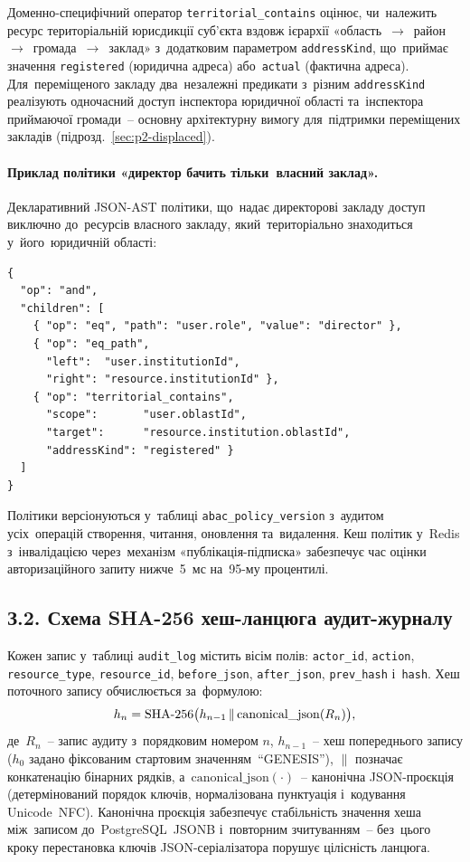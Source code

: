 Доменно-специфічний оператор \texttt{territorial\_contains} оцінює, чи~належить ресурс територіальній юрисдикції суб'єкта вздовж ієрархії «область~$\to$~район~$\to$~громада~$\to$~заклад» з~додатковим параметром \texttt{addressKind}, що~приймає значення \texttt{registered} (юридична адреса) або~\texttt{actual} (фактична адреса). Для~переміщеного закладу два~незалежні предикати з~різним \texttt{addressKind} реалізують одночасний доступ інспектора юридичної області та~інспектора приймаючої громади~-- основну архітектурну вимогу для~підтримки переміщених закладів (підрозд.~\ref{sec:p2-displaced}).

\paragraph{Приклад політики «директор бачить тільки~власний заклад».} Декларативний JSON-AST політики, що~надає директорові закладу доступ виключно до~ресурсів власного закладу, який~територіально знаходиться у~його~юридичній області:

\begin{verbatim}
{
  "op": "and",
  "children": [
    { "op": "eq", "path": "user.role", "value": "director" },
    { "op": "eq_path",
      "left":  "user.institutionId",
      "right": "resource.institutionId" },
    { "op": "territorial_contains",
      "scope":       "user.oblastId",
      "target":      "resource.institution.oblastId",
      "addressKind": "registered" }
  ]
}
\end{verbatim}

Політики версіонуються у~таблиці \texttt{abac\_policy\_version} з~аудитом усіх~операцій створення, читання, оновлення та~видалення. Кеш політик у~Redis з~інвалідацією через~механізм «публікація-підписка» забезпечує час оцінки авторизаційного запиту нижче~5~мс на~95-му процентилі.

\subsection*{З.2. Схема SHA-256 хеш-ланцюга аудит-журналу}
\label{app:audit-schema}

Кожен запис у~таблиці \texttt{audit\_log} містить вісім полів: \texttt{actor\_id}, \texttt{action}, \texttt{resource\_type}, \texttt{resource\_id}, \texttt{before\_json}, \texttt{after\_json}, \texttt{prev\_hash} і~\texttt{hash}. Хеш поточного запису обчислюється за~формулою:
\begin{equation*}
    h_n = \mathrm{SHA{\text -}256}\bigl(h_{n-1} \,\|\, \mathrm{canonical\_json}(R_n)\bigr),
\end{equation*}
де~$R_n$~-- запис аудиту з~порядковим номером $n$, $h_{n-1}$~-- хеш попереднього запису ($h_0$ задано фіксованим стартовим значенням~``GENESIS''), $\|$ позначає конкатенацію бінарних рядків, а~$\mathrm{canonical\_json}(\cdot)$~-- канонічна JSON-проєкція (детермінований порядок ключів, нормалізована пунктуація і~кодування Unicode~NFC). Канонічна проєкція забезпечує стабільність значення хеша між~записом до~PostgreSQL~JSONB і~повторним зчитуванням~-- без~цього кроку перестановка ключів JSON-серіалізатора порушує цілісність ланцюга.


